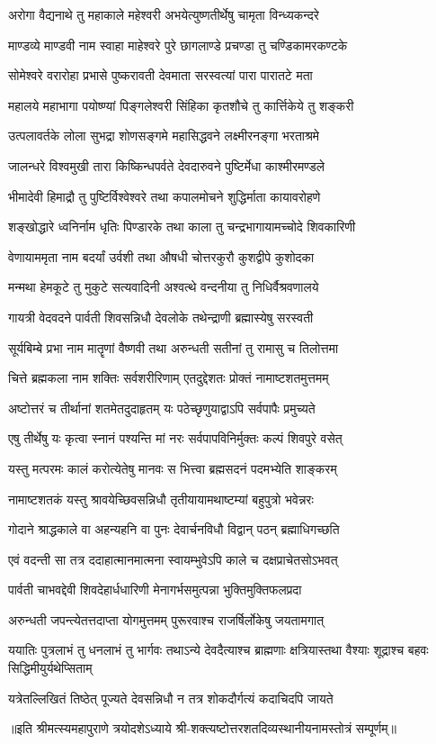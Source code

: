\twolineshloka
{अरोगा वैद्यनाथे तु महाकाले महेश्वरी}
{अभयेत्युष्णतीर्थेषु चामृता विन्ध्यकन्दरे}

\twolineshloka
{माण्डव्ये माण्डवी नाम स्वाहा माहेश्वरे पुरे}
{छागलाण्डे प्रचण्डा तु चण्डिकामरकण्टके}

\twolineshloka
{सोमेश्वरे वरारोहा प्रभासे पुष्करावती}
{देवमाता सरस्वत्यां पारा पारातटे मता}

\twolineshloka
{महालये महाभागा पयोष्ण्यां पिङ्गलेश्वरी}
{सिंहिका कृतशौचे तु कार्त्तिकेये तु शङ्करी}

\twolineshloka
{उत्पलावर्तके लोला सुभद्रा शोणसङ्गमे}
{महासिद्धवने लक्ष्मीरनङ्गा भरताश्रमे}

\twolineshloka
{जालन्धरे विश्वमुखी तारा किष्किन्धपर्वते}
{देवदारुवने पुष्टिर्मेधा काश्मीरमण्डले}

\twolineshloka
{भीमादेवी हिमाद्रौ तु पुष्टिर्विश्वेश्वरे तथा}
{कपालमोचने शुद्धिर्माता कायावरोहणे}

\twolineshloka
{शङ्खोद्धारे ध्वनिर्नाम धृतिः पिण्डारके तथा}
{काला तु चन्द्रभागायामच्चोदे शिवकारिणी}

\twolineshloka
{वेणायाममृता नाम बदर्यां उर्वशी तथा}
{औषधी चोत्तरकुरौ कुशद्वीपे कुशोदका}

\twolineshloka
{मन्मथा हेमकूटे तु मुकुटे सत्यवादिनी}
{अश्वत्थे वन्दनीया तु निधिर्वैश्रवणालये}

\twolineshloka
{गायत्री वेदवदने पार्वती शिवसन्निधौ}
{देवलोके तथेन्द्राणी ब्रह्मास्येषु सरस्वती}

\twolineshloka
{सूर्यबिम्बे प्रभा नाम मातॄणां वैष्णवी तथा}
{अरुन्धती सतीनां तु रामासु च तिलोत्तमा}

\twolineshloka
{चित्ते ब्रह्मकला नाम शक्तिः सर्वशरीरिणाम्}
{एतदुद्देशतः प्रोक्तं नामाष्टशतमुत्तमम्}

\twolineshloka
{अष्टोत्तरं च तीर्थानां शतमेतदुदाहृतम्}
{यः पठेच्छृणुयाद्वाऽपि सर्वपापैः प्रमुच्यते}

\twolineshloka
{एषु तीर्थेषु यः कृत्वा स्नानं पश्यन्ति मां नरः}
{सर्वपापविनिर्मुक्तः कल्पं शिवपुरे वसेत्}

\twolineshloka
{यस्तु मत्परमः कालं करोत्येतेषु मानवः}
{स भित्त्वा ब्रह्मसदनं पदमभ्येति शाङ्करम्}

\twolineshloka
{नामाष्टशतकं यस्तु श्रावयेच्छिवसन्निधौ}
{तृतीयायामथाष्टम्यां बहुपुत्रो भवेन्नरः}

\twolineshloka
{गोदाने श्राद्धकाले वा अहन्यहनि वा पुनः}
{देवार्चनविधौ विद्वान् पठन् ब्रह्माधिगच्छति}

\twolineshloka
{एवं वदन्ती सा तत्र ददाहात्मानमात्मना}
{स्वायम्भुवेऽपि काले च दक्षप्राचेतसोऽभवत्}

\twolineshloka
{पार्वती चाभवद्देवी शिवदेहार्धधारिणी}
{मेनागर्भसमुत्पन्ना भुक्तिमुक्तिफलप्रदा}

\twolineshloka
{अरुन्धती जपन्त्येतत्तदाप्ता योगमुत्तमम्}
{पुरूरवाश्च राजर्षिर्लोकेषु जयतामगात्}

\threelineshloka
{ययातिः पुत्रलाभं तु धनलाभं तु भार्गवः}
{तथाऽन्ये देवदैत्याश्च ब्राह्मणाः क्षत्रियास्तथा}
{वैश्याः शूद्राश्च बहवः सिद्धिमीयुर्यथेप्सिताम्}

\twolineshloka
{यत्रेतल्लिखितं तिष्ठेत् पूज्यते देवसन्निधौ}
{न तत्र शोकदौर्गत्यं कदाचिदपि जायते}

॥इति श्रीमत्स्यमहापुराणे त्रयोदशेऽध्याये श्री-शक्त्यष्टोत्तरशतदिव्यस्थानीयनामस्तोत्रं सम्पूर्णम्॥